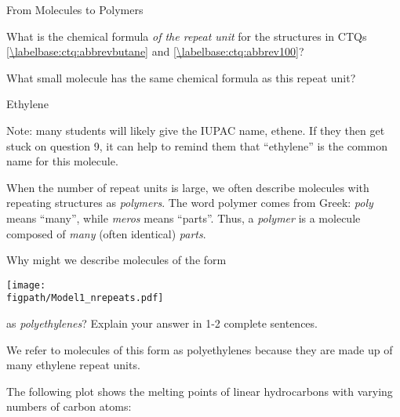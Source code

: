 \begin{activity}{From Molecules to Polymers}
\begin{ctqs}
	\question What is the chemical formula \emph{of the repeat unit} for the structures in CTQs \ref{\labelbase:ctq:abbrevbutane} and \ref{\labelbase:ctq:abbrev100}?
		
		\begin{solution}[0.75in]
		\end{solution}
	
	\question What small molecule has the same chemical formula as this repeat unit?
		
		\begin{solution}[0.75in]
			Ethylene
			
			Note: many students will likely give the IUPAC name, ethene.  If they then get stuck on question 9, it can help to remind them that ``ethylene'' is the common name for this molecule.
		\end{solution}
	
\end{ctqs}

\begin{infobox}
	When the number of repeat units is large, we often describe molecules with repeating structures as \emph{polymers}.  The word polymer comes from Greek: \emph{poly} means ``many'', while \emph{meros} means ``parts''.  Thus, a \emph{polymer} is a molecule composed of \emph{many} (often identical) \emph{parts}.
\end{infobox}

\begin{ctqs}
	\question Why might we describe molecules of the form
	
		\centerline{\texttt{[image: \\figpath/Model1\_nrepeats.pdf]}}
			
		as \emph{polyethylenes}?  Explain your answer in 1-2 complete sentences.
		
		\begin{solution}[2in]
			We refer to molecules of this form as polyethylenes because they are made up of many ethylene repeat units.
		\end{solution}
\end{ctqs}

\clearpage
\begin{model}
	\label{\labelbase:mdl:hydrocarbonmelting}

	The following plot shows the melting points of linear hydrocarbons with varying numbers of carbon atoms:
	
	\vspace{6pt}
	

\end{model}
\end{activity}
